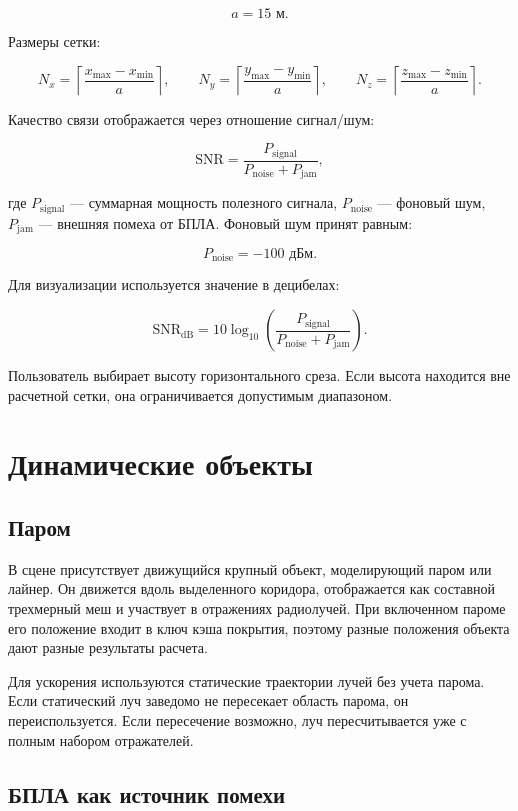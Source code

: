 \documentclass[12pt,a4paper]{article}
\begin{document}
\[
a = 15\text{ м}.
\]

Размеры сетки:

\[
N_x = \left\lceil \frac{x_{\max} - x_{\min}}{a} \right\rceil,
\qquad
N_y = \left\lceil \frac{y_{\max} - y_{\min}}{a} \right\rceil,
\qquad
N_z = \left\lceil \frac{z_{\max} - z_{\min}}{a} \right\rceil.
\]

Качество связи отображается через отношение сигнал/шум:

\[
\mathrm{SNR} =
\frac{P_{\text{signal}}}
{P_{\text{noise}} + P_{\text{jam}}},
\]

где $P_{\text{signal}}$ --- суммарная мощность полезного сигнала, $P_{\text{noise}}$ --- фоновый шум, $P_{\text{jam}}$ --- внешняя помеха от БПЛА. Фоновый шум принят равным:

\[
P_{\text{noise}} = -100\text{ дБм}.
\]

Для визуализации используется значение в децибелах:

\[
\mathrm{SNR}_{\text{dB}} =
10\log_{10}
\left(
\frac{P_{\text{signal}}}
{P_{\text{noise}} + P_{\text{jam}}}
\right).
\]

Пользователь выбирает высоту горизонтального среза. Если высота находится вне расчетной сетки, она ограничивается допустимым диапазоном.

\section{Динамические объекты}

\subsection{Паром}

В сцене присутствует движущийся крупный объект, моделирующий паром или лайнер. Он движется вдоль выделенного коридора, отображается как составной трехмерный меш и участвует в отражениях радиолучей. При включенном пароме его положение входит в ключ кэша покрытия, поэтому разные положения объекта дают разные результаты расчета.

Для ускорения используются статические траектории лучей без учета парома. Если статический луч заведомо не пересекает область парома, он переиспользуется. Если пересечение возможно, луч пересчитывается уже с полным набором отражателей.

\subsection{БПЛА как источник помехи}
\end{document}
